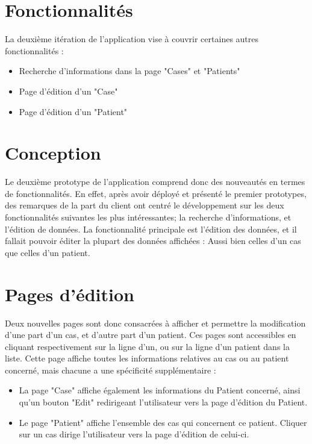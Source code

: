 
\section{Fonctionnalités}

	La deuxième itération de l'application vise à couvrir certaines autres fonctionnalités :
	\begin{itemize}
		\item Recherche d'informations dans la page "Cases" et "Patients"
		\item Page d'édition d'un "Case"
		\item Page d'édition d'un "Patient"
	\end{itemize}

\section{Conception}

	Le deuxième prototype de l'application comprend donc des nouveautés en termes de fonctionnalités. En effet, après avoir déployé et présenté le premier prototypes, des remarques de la part du client ont centré le développement sur les deux fonctionnalités suivantes les plus intéressantes; la recherche d'informations, et l'édition de données. La fonctionnalité principale est l'édition des données, et il fallait pouvoir éditer la plupart des données affichées : Aussi bien celles d'un cas que celles d'un patient.

	\section{Pages d'édition}
	
		Deux nouvelles pages sont donc consacrées à afficher et permettre la modification d'une part d'un cas, et d'autre part d'un patient. Ces pages sont accessibles en cliquant respectivement sur la ligne d'un, ou sur la ligne d'un patient dans la liste. Cette page affiche toutes les informations relatives au cas ou au patient concerné, mais chacune a une spécificité supplémentaire :

		\begin{itemize}
			\item La page "Case" affiche également les informations du Patient concerné, ainsi qu'un bouton "Edit" redirigeant l'utilisateur vers la page d'édition du Patient.
			\item Le page "Patient" affiche l'ensemble des cas qui concernent ce patient. Cliquer sur un cas dirige l'utilisateur vers la page d'édition de celui-ci.
		\end{itemize}

